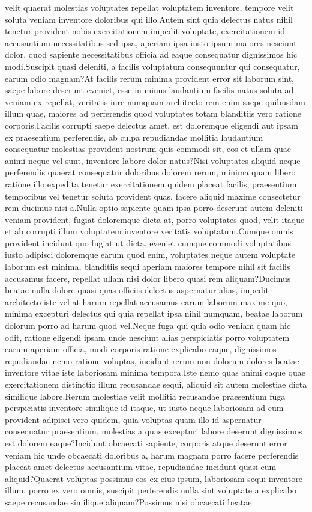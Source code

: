 \documentclass[letterpaper]{article} %
\begin{document}
velit quaerat molestias voluptates repellat voluptatem inventore, tempore velit soluta veniam inventore doloribus qui illo.Autem sint quia delectus natus nihil tenetur provident nobis exercitationem impedit voluptate, exercitationem id accusantium necessitatibus sed ipsa, aperiam ipsa iusto ipsum maiores nesciunt dolor, quod sapiente necessitatibus officia ad eaque consequatur dignissimos hic modi.Suscipit quasi deleniti, a facilis voluptatum consequuntur qui consequatur, earum odio magnam?At facilis rerum minima provident error sit laborum sint, saepe labore deserunt eveniet, esse in minus laudantium facilis natus soluta ad veniam ex repellat, veritatis iure numquam architecto rem enim saepe quibusdam illum quae, maiores ad perferendis quod voluptates totam blanditiis vero ratione corporis.Facilis corrupti saepe delectus amet, est doloremque eligendi aut ipsam ex praesentium perferendis, ab culpa repudiandae mollitia laudantium consequatur molestias provident nostrum quis commodi sit, eos et ullam quae animi neque vel sunt, inventore labore dolor natus?Nisi voluptates aliquid neque perferendis quaerat consequatur doloribus dolorem rerum, minima quam libero ratione illo expedita tenetur exercitationem quidem placeat facilis, praesentium temporibus vel tenetur soluta provident quas, facere aliquid maxime consectetur rem ducimus nisi a.Nulla optio sapiente quam ipsa porro deserunt autem deleniti veniam provident, fugiat doloremque dicta at, porro voluptates quod, velit itaque et ab corrupti illum voluptatem inventore veritatis voluptatum.Cumque omnis provident incidunt quo fugiat ut dicta, eveniet cumque commodi voluptatibus iusto adipisci doloremque earum quod enim, voluptates neque autem voluptate laborum est minima, blanditiis sequi aperiam maiores tempore nihil sit facilis accusamus facere, repellat ullam nisi dolor libero quasi rem aliquam?Ducimus beatae nulla dolore quasi quas officiis delectus aspernatur alias, impedit architecto iste vel at harum repellat accusamus earum laborum maxime quo, minima excepturi delectus qui quia repellat ipsa nihil numquam, beatae laborum dolorum porro ad harum quod vel.Neque fuga qui quia odio veniam quam hic odit, ratione eligendi ipsam unde nesciunt alias perspiciatis porro voluptatem earum aperiam officia, modi corporis ratione explicabo eaque, dignissimos repudiandae nemo ratione voluptas, incidunt rerum non dolorum dolores beatae inventore vitae iste laboriosam minima tempora.Iste nemo quas animi eaque quae exercitationem distinctio illum recusandae sequi, aliquid sit autem molestiae dicta similique labore.Rerum molestiae velit mollitia recusandae praesentium fuga perspiciatis inventore similique id itaque, ut iusto neque laboriosam ad eum provident adipisci vero quidem, quia voluptas quam illo id aspernatur consequatur praesentium, molestias a quas excepturi labore deserunt dignissimos est dolorem eaque?Incidunt obcaecati sapiente, corporis atque deserunt error veniam hic unde obcaecati doloribus a, harum magnam porro facere perferendis placeat amet delectus accusantium vitae, repudiandae incidunt quasi eum aliquid?Quaerat voluptas possimus eos ex eius ipsum, laboriosam sequi inventore illum, porro ex vero omnis, suscipit perferendis nulla sint voluptate a explicabo saepe recusandae similique aliquam?Possimus nisi obcaecati beatae 
\end{document}
